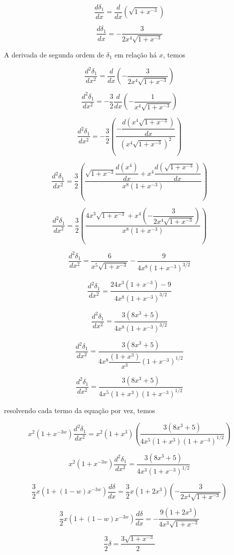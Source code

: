 \documentclass[a4paper,12pt]{article}
\begin{document}
$$\dfrac{d \delta_1}{dx} = \dfrac{d}{dx}\left( \sqrt{1+x^{-3}}\right)$$

$$\dfrac{d \delta_1}{dx} = - \dfrac{3}{2x^4\sqrt{1+x^{-3}}}$$

A derivada de segunda ordem de $\delta_1$ em relação há $x$, temos

$$\dfrac{d^2 \delta_1}{dx^2} = \dfrac{d}{dx}\left(- \dfrac{3}{2x^4\sqrt{1+x^{-3}}}\right)$$

$$\dfrac{d^2 \delta_1}{dx^2} = -\dfrac{3}{2}\dfrac{d}{dx}\left(- \dfrac{1}{x^4\sqrt{1+x^{-3}}}\right)$$

$$\dfrac{d^2 \delta_1}{dx^2} = -\dfrac{3}{2}\left(\dfrac{-\dfrac{d (x^4\sqrt{1+x^{-3}})}{dx}}{(x^4\sqrt{1+x^{-3}})^2}\right)$$

$$\dfrac{d^2 \delta_1}{dx^2} = \dfrac{3}{2}\left(\dfrac{\sqrt{1+x^{-3}}\dfrac{d (x^4)}{dx}+x^4\dfrac{d(\sqrt{1+x^{-3}})}{dx}}{x^8(1+x^{-3})}\right)$$

$$\dfrac{d^2 \delta_1}{dx^2} = \dfrac{3}{2}\left(\dfrac{4x^3\sqrt{1+x^{-3}}+x^4\left(- \dfrac{3}{2x^4\sqrt{1+x^{-3}}}\right)}{x^8(1+x^{-3})}\right)$$

$$\dfrac{d^2 \delta_1}{dx^2} = \dfrac{6}{x^5\sqrt{1+ x^{-3}} }-\frac{9}{4x^8 \left(1+x^{-3}\right)^{3/2} }$$

$$ \dfrac{d^2 \delta_1}{dx^2} = \dfrac{24x^3 (1+x^{-3}) - 9}{4x^8 \left(1+x^{-3}\right)^{3/2} }$$

$$ \dfrac{d^2 \delta_1}{dx^2} = \dfrac{3 (8x^3 + 5)}{4x^8 \left(1+x^{-3}\right)^{3/2} }$$

$$ \dfrac{d^2 \delta_1}{dx^2} = \dfrac{3 (8x^3 + 5)}{4x^8\dfrac{(1+x^3)}{x^3} \left(1+x^{-3}\right)^{1/2} }$$

$$ \dfrac{d^2 \delta_1}{dx^2} = \dfrac{3 (8x^3 + 5)}{4x^5 (1+x^3)\left(1+x^{-3}\right)^{1/2} }$$

resolvendo cada termo da equação por vez, temos

$$x^2 (1+x^{-3w})\dfrac{d^2\delta_1}{dx^2} = x^2 (1+x^3)\left( \dfrac{3 (8x^3 + 5)}{4x^5 (1+x^3)\left(1+x^{-3}\right)^{1/2} }\right)$$

$$x^2 (1+x^{-3w})\dfrac{d^2\delta_1}{dx^2} = \dfrac{3 (8x^3 + 5)}{4x^3\left(1+x^{-3}\right)^{1/2} }$$

$$\dfrac{3}{2}x(1+ (1-w)x^{-3w})\dfrac{d\delta}{dx} = \dfrac{3}{2}x(1+ 2x^{3})\left(  - \dfrac{3}{2x^4\sqrt{1+x^{-3}}}\right)$$

$$\dfrac{3}{2}x(1+ (1-w)x^{-3w})\dfrac{d\delta}{dx} =- \dfrac{9(1+ 2x^{3})}{4x^3\sqrt{1+x^{-3}}}$$

$$\dfrac{3}{2}\delta = \dfrac{3\sqrt{1+x^{-3}}}{2}$$
\end{document}
